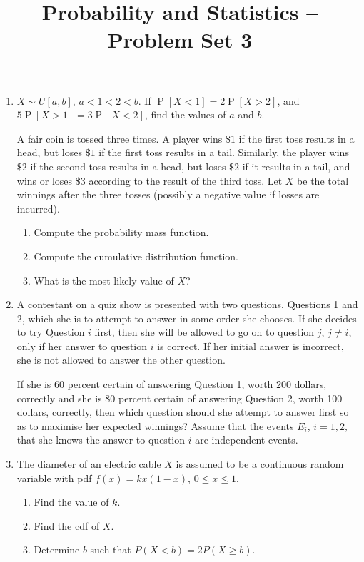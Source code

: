 \documentclass[svgnames]{amsart}
\title[]{Probability and Statistics -- Problem Set 3}
\DeclareMathOperator{\Prob}{P}
\begin{document}
\maketitle
\begin{enumerate}[leftmargin=*, itemsep=0.3em]
\item $X \sim U[a,b]$, $a < 1 < 2 < b$. If $\Prob[X < 1] = 2\Prob[X > 2]$, and $5\Prob[X > 1] = 3\Prob[X < 2]$, find the values of $a$ and $b$.

A fair coin is tossed three times. A player wins $\$1$ if the first toss results in a head, but loses $\$1$ if the first toss results in a tail. Similarly, the player wins $\$2$ if the second toss results in a head, but loses $\$2$ if it results in a tail, and wins or loses $\$3$ according to the result of the third toss. Let $X$ be the total winnings after the three tosses (possibly a negative value if losses are incurred).
\begin{enumerate}
    \item Compute the probability mass function.
    \item Compute the cumulative distribution function.
    \item What is the most likely value of $X$?
\end{enumerate}

\item A contestant on a quiz show is presented with two questions, Questions 1 and 2, which she is to attempt to answer in some order she chooses. If she decides to try Question $i$ first, then she will be allowed to go on to question $j$, $j \neq i$, only if her answer to question $i$ is correct. If her initial answer is incorrect, she is not allowed to answer the other question.

If she is $60$ percent certain of answering Question 1, worth $200$ dollars, correctly and she is $80$ percent certain of answering Question 2, worth 100 dollars, correctly, then which question should she attempt to answer first so as to maximise her expected winnings? Assume that the events $E_i$, $i = 1, 2,$ that she knows the answer to question $i$ are independent
events.

\item The diameter of an electric cable $X$ is assumed to be a continuous random variable with pdf $f(x) = kx (1- x)$, $0 \leq  x \leq 1$.
\begin{enumerate}
    \item Find the value of $k$.
    \item Find the cdf of $X$.
    \item Determine $b$ such that $P(X < b) = 2 P(X \geq b)$.
\end{enumerate}


\end{enumerate}
\end{document}
